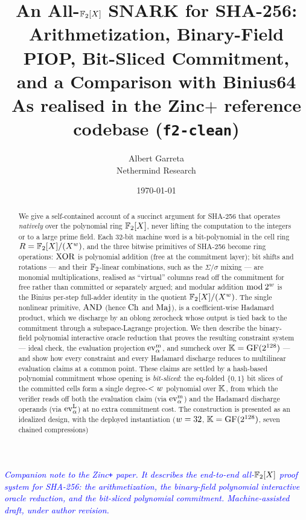 \documentclass[11pt]{article}
\title{An All-$\mathbb{F}_2[X]$ SNARK for SHA-256:\\
       Arithmetization, Binary-Field PIOP, Bit-Sliced Commitment,\\
       and a Comparison with Binius64\\[4pt]
       \large As realised in the Zinc\texorpdfstring{$+$}{+} reference
       codebase (\texttt{f2-clean})}
\author{Albert Garreta \\[2pt] \normalsize Nethermind Research}
\date{\today}
\begin{document}
\maketitle

\begin{center}
\textcolor{blue}{\textit{Companion note to the Zinc\texttt{+} paper. It
describes the end-to-end all-$\mathbb{F}_2[X]$ proof system for SHA-256: the
arithmetization, the binary-field polynomial interactive oracle
reduction, and the bit-sliced polynomial commitment. Machine-assisted
draft, under author revision.}}
\end{center}
\vspace{0.5em}

\begin{abstract}
We give a self-contained account of a succinct argument for SHA-256 that
operates \emph{natively} over the polynomial ring $\mathbb{F}_2[X]$, never
lifting the computation to the integers or to a large prime field. Each
$32$-bit machine word is a bit-polynomial in the cell ring
$R = \mathbb{F}_2[X]/(X^{w})$, and the three bitwise primitives of
SHA-256 become ring operations: $\operatorname{XOR}$ is polynomial addition (free at
the commitment layer); bit shifts and rotations --- and their
$\mathbb{F}_2$-linear combinations, such as the $\Sigma/\sigma$ mixing --- are
monomial multiplications, realised as ``virtual'' columns read off the
commitment for free rather than committed or separately argued; and modular
addition $\bmod\,2^{w}$ is the Binius per-step full-adder identity in
the quotient $\mathbb{F}_2[X]/(X^{w})$. The single nonlinear primitive, $\operatorname{AND}$ (hence
$\operatorname{Ch}$ and $\operatorname{Maj}$), is a coefficient-wise Hadamard product, which we
discharge by an oblong zerocheck whose output is tied back to the
commitment through a subspace-Lagrange projection. We then describe the
binary-field polynomial interactive oracle reduction that proves the
resulting constraint system --- ideal check, the evaluation projection
$\operatorname{ev}^{\mathrm{m}}_{\alpha}$, and sumcheck over $\mathbb{K} = \mathrm{GF}(2^{128})$ --- and show how
every constraint and every Hadamard discharge reduces to multilinear
evaluation claims at a common point. These claims are settled by a
hash-based polynomial commitment whose opening is \emph{bit-sliced}:
the eq-folded $\{0,1\}$ bit slices of the committed cells form a single
degree-$<w$ polynomial over $\mathbb{K}$, from which the verifier reads off
both the evaluation claim (via $\operatorname{ev}^{\mathrm{m}}_{\alpha}$) and the Hadamard discharge
operands (via $\operatorname{ev}^{\mathrm{L}}_{\alpha}$) at no extra commitment cost. The construction is
presented as an idealized design, with the deployed instantiation
($w = 32$, $\mathbb{K}=\mathrm{GF}(2^{128})$, seven chained compressions)

\end{abstract}
\end{document}
